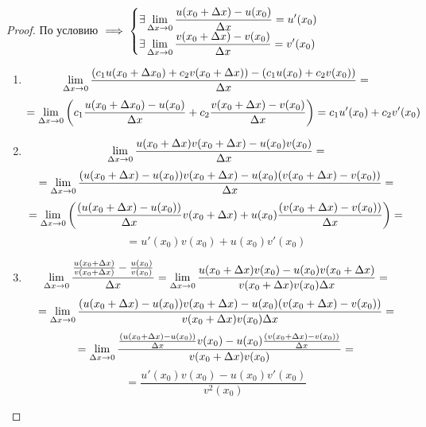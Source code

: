 \begin{proof}
    По условию $\implies \begin{cases}
        \exists \displaystyle\lim_{\Delta x \to 0} \frac{u(x_0 + \Delta x) - u(x_0)}{\Delta x} = u'(x_0) \\
        \exists \displaystyle\lim_{\Delta x \to 0} \frac{v(x_0 + \Delta x) - v(x_0)}{\Delta x} = v'(x_0)
    \end{cases}$

    \begin{enumerate}[label=\alph*)]
        \item
            \[ \displaystyle\lim_{\Delta x \to 0} \frac{(c_1 u(x_0 + \Delta x_0) + c_2 v(x_0 + \Delta x)) - (c_1 u(x_0) + c_2 v(x_0))}{\Delta x} = \]
            \[ 
                = \displaystyle\lim_{\Delta x \to 0} \left( c_1 \frac{u(x_0 + \Delta x_0) - u(x_0)}{\Delta x} + c_2 \frac{v(x_0 + \Delta x) - v(x_0)}{\Delta x} \right) 
                = c_1 u'(x_0) + c_2 v'(x_0) 
            \]

        \item 
            \[ \displaystyle\lim_{\Delta x \to 0} \frac{u(x_0 + \Delta x) v(x_0 + \Delta x) - u(x_0) v(x_0)}{\Delta x} = \]
            \[ = \displaystyle\lim_{\Delta x \to 0} \frac{(u(x_0 + \Delta x) - u(x_0)) v(x_0 + \Delta x) - u(x_0) (v(x_0 + \Delta x) - v(x_0))}{\Delta x} = \]
            \[ = \displaystyle\lim_{\Delta x \to 0} \left( \frac{(u(x_0 + \Delta x) - u(x_0))}{\Delta x} v(x_0 + \Delta x) + u(x_0) \frac{(v(x_0 + \Delta x) - v(x_0))}{\Delta x} \right) = \]
            \[ = u'(x_0) v(x_0) + u(x_0) v'(x_0) \]

        \item
            \[
                \displaystyle\lim_{\Delta x \to 0} \frac{ \frac{u(x_0 + \Delta x)}{v(x_0 + \Delta x)} - \frac{u(x_0)}{v(x_0)} }{\Delta x}
                = \displaystyle\lim_{\Delta x \to 0} \frac{ u(x_0 + \Delta x) v(x_0) - u(x_0) v(x_0 + \Delta x) }{ v(x_0 + \Delta x) v(x_0) \Delta x } =
            \]
            \[ = \displaystyle\lim_{\Delta x \to 0} \frac{(u(x_0 + \Delta x) - u(x_0)) v(x_0 + \Delta x) - u(x_0) (v(x_0 + \Delta x) - v(x_0))}{ v(x_0 + \Delta x) v(x_0) \Delta x } = \]
            \[ = \displaystyle\lim_{\Delta x \to 0} \frac{ \frac{(u(x_0 + \Delta x) - u(x_0))}{\Delta x} v(x_0) - u(x_0) \frac{(v(x_0 + \Delta x) - v(x_0))}{\Delta x} }{v(x_0 + \Delta x) v(x_0)} = \]
            \[ = \frac{u'(x_0) v(x_0) - u(x_0) v'(x_0)}{v^2(x_0)} \]
    \end{enumerate}
\end{proof}

